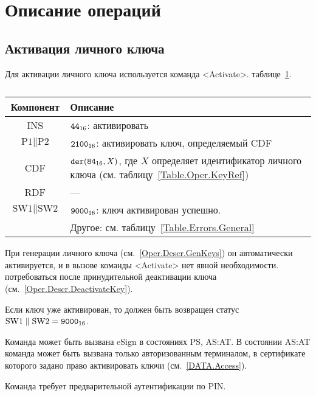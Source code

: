 \section{Описание операций}\label{Oper.Descr}

\subsection{Активация личного ключа}\label{Oper.Descr.ActivateKey}

Для активации личного ключа используется команда <Activate>.
 таблице~\ref{Table.Oper.ActivateCmd}.

\begin{table}[hbt]
\caption{}\label{Table.Oper.ActivateCmd}
\begin{tabular}{|c|p{14cm}|}
\hline
Компонент & Описание\\
\hline
\hline
INS & $\texttt{44}_{16}$: активировать\\
\hline
$\text{P1} \parallel \text{P2}$ & $\texttt{2100}_{16}$: 
активировать ключ, определяемый CDF\\
\hline
CDF &  $\texttt{der}(\texttt{84}_{16}, X)$,   
где $X$ определяет идентификатор личного ключа 
(см. таблицу~\ref{Table.Oper.KeyRef}) \\ 
\hline
RDF &  --- \\
\hline
$\text{SW1} \parallel \text{SW2}$ & $\texttt{9000}_{16}$: ключ активирован успешно. \\
  & Другое: см. таблицу~\ref{Table.Errors.General} \\
\hline
\end{tabular}
\end{table}

При генерации личного ключа (см.~\ref{Oper.Descr.GenKeys})
он автоматически активируется, и в вызове команды <Activate> нет явной 
необходимости.  потребоваться после 
принудительной деактивации ключа (см.~\ref{Oper.Descr.DeactivateKey}).  

Если ключ уже активирован, то должен быть 
возвращен статус $\text{SW1} \parallel \text{SW2} = \texttt{9000}_{16}$.

Команда может быть вызвана  eSign в 
состояниях PS, AS:AT. В состоянии AS:AT команда может быть вызвана только 
авторизованным терминалом, в сертификате которого задано 
право активировать ключи (см.~\ref{DATA.Access}).

Команда требует предварительной аутентификации по PIN.

